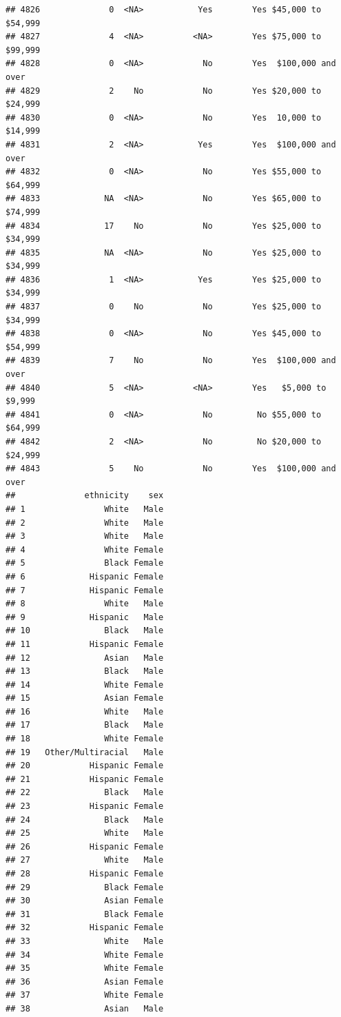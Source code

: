 \documentclass[man]{apa6}
\begin{document}
\begin{verbatim}
## 4826              0  <NA>           Yes        Yes $45,000 to $54,999
## 4827              4  <NA>          <NA>        Yes $75,000 to $99,999
## 4828              0  <NA>            No        Yes  $100,000 and over
## 4829              2    No            No        Yes $20,000 to $24,999
## 4830              0  <NA>            No        Yes  10,000 to $14,999
## 4831              2  <NA>           Yes        Yes  $100,000 and over
## 4832              0  <NA>            No        Yes $55,000 to $64,999
## 4833             NA  <NA>            No        Yes $65,000 to $74,999
## 4834             17    No            No        Yes $25,000 to $34,999
## 4835             NA  <NA>            No        Yes $25,000 to $34,999
## 4836              1  <NA>           Yes        Yes $25,000 to $34,999
## 4837              0    No            No        Yes $25,000 to $34,999
## 4838              0  <NA>            No        Yes $45,000 to $54,999
## 4839              7    No            No        Yes  $100,000 and over
## 4840              5  <NA>          <NA>        Yes   $5,000 to $9,999
## 4841              0  <NA>            No         No $55,000 to $64,999
## 4842              2  <NA>            No         No $20,000 to $24,999
## 4843              5    No            No        Yes  $100,000 and over
##              ethnicity    sex
## 1                White   Male
## 2                White   Male
## 3                White   Male
## 4                White Female
## 5                Black Female
## 6             Hispanic Female
## 7             Hispanic Female
## 8                White   Male
## 9             Hispanic   Male
## 10               Black   Male
## 11            Hispanic Female
## 12               Asian   Male
## 13               Black   Male
## 14               White Female
## 15               Asian Female
## 16               White   Male
## 17               Black   Male
## 18               White Female
## 19   Other/Multiracial   Male
## 20            Hispanic Female
## 21            Hispanic Female
## 22               Black   Male
## 23            Hispanic Female
## 24               Black   Male
## 25               White   Male
## 26            Hispanic Female
## 27               White   Male
## 28            Hispanic Female
## 29               Black Female
## 30               Asian Female
## 31               Black Female
## 32            Hispanic Female
## 33               White   Male
## 34               White Female
## 35               White Female
## 36               Asian Female
## 37               White Female
## 38               Asian   Male

\end{verbatim}
\end{document}
